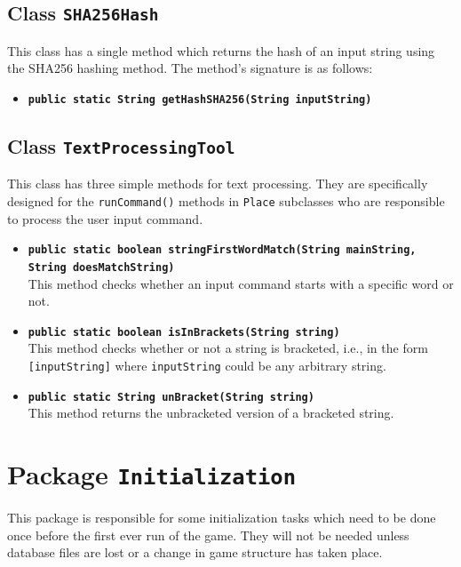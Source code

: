 \documentclass[a4paper]{article}
\begin{document}
\subsection{Class \texttt{SHA256Hash}}
This class has a single method which returns the hash of an input string using the SHA256 hashing method. The method's signature is as follows:
\begin{itemize}
	\item \texttt{\textbf{public static String getHashSHA256(String inputString)}}
\end{itemize}

\subsection{Class \texttt{TextProcessingTool}}
This class has three simple methods for text processing. They are specifically designed for the \texttt{runCommand()} methods in \texttt{Place} subclasses who are responsible to process the user input command.

\begin{itemize}
	\item \texttt{\textbf{public static boolean stringFirstWordMatch(String mainString,\\ String doesMatchString)}}\\
	This method checks whether an input command starts with a specific word or not.
	
	\item \texttt{\textbf{public static boolean isInBrackets(String string)}}\\
	This method checks whether or not a string is bracketed, i.e., in the form \texttt{[inputString]} where \texttt{inputString} could be any arbitrary string.
	
	\item \texttt{\textbf{public static String unBracket(String string)}}\\
	This method returns the unbracketed version of a bracketed string.
	
\end{itemize}


\clearpage
\section{Package \texttt{Initialization}} \label{initialization}
This package is responsible for some initialization tasks which need to be done once before the first ever run of the game. They will not be needed unless database files are lost or a change in game structure has taken place.
\end{document}
